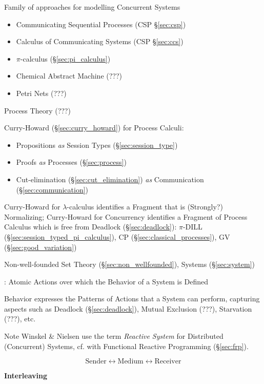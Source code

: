 Family of approaches for modelling Concurrent Systems

\begin{itemize}
\item Communicating Sequential Processes (CSP \S\ref{sec:csp})
\item Calculus of Communicating Systems (CSP \S\ref{sec:ccs})
\item $\pi$-calculus (\S\ref{sec:pi_calculus})
\item Chemical Abstract Machine (???)
\item Petri Nets (???)
\end{itemize}

Process Theory (???)

Curry-Howard (\S\ref{sec:curry_howard}) for Process Calculi:
\begin{itemize}
  \item Propositions \emph{as} Session Types (\S\ref{sec:session_type})
  \item Proofs \emph{as} Processes (\S\ref{sec:process})
  \item Cut-elimination (\S\ref{sec:cut_elimination}) \emph{as}
    Communication (\S\ref{sec:communication})
\end{itemize}

Curry-Howard for $\lambda$-calculus identifies a Fragment that is
(Strongly?) Normalizing; Curry-Howard for Concurrency identifies a
Fragment of Process Calculus which is free from Deadlock
(\S\ref{sec:deadlock}): $\pi$-DILL
(\S\ref{sec:session_typed_pi_calculus}), CP
(\S\ref{sec:classical_processes}), GV (\S\ref{sec:good_variation})

Non-well-founded Set Theory (\S\ref{sec:non_wellfounded}), Systems
(\S\ref{sec:system})


\asterism


\cite{winskel-nielsen93}: Atomic Actions over which the Behavior of a
System is Defined %

Behavior expresses the Patterns of Actions that a System can perform,
capturing aspects such as Deadlock (\S\ref{sec:deadlock}), Mutual
Exclusion (???), Starvation (???), etc.

\fist Note Winskel \& Nielsen \cite{winskel-nielsen93} use the term
\emph{Reactive System} for Distributed (Concurrent) Systems, cf. with
Functional Reactive Programming (\S\ref{sec:frp}).

\[
  \text{Sender} \leftrightarrow \text{Medium}
    \leftrightarrow \text{Receiver}
\]


\textbf{Interleaving}

